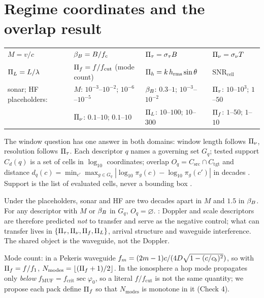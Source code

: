 \documentclass[10pt,a4paper]{article}
\begin{document}
\section{Regime coordinates and the overlap result}
\vspace{-4pt}
\begin{center}\footnotesize\setlength{\tabcolsep}{4pt}
\begin{tabular}{@{}llll@{}}
\toprule
$M=v/c$ & $\beta_{B}=B/f_c$ & $\Pi_{\tau}=\sigma_{\tau} B$ & $\Pi_{\nu}=\sigma_{\nu} T$ \\
$\Pi_{L}=L/\lambda$ & $\Pi_{f}=f/f_{\mathrm{cut}}$ (mode count) & $\Pi_{h}=k\,h_{\mathrm{rms}}\sin\theta$ & $\mathrm{SNR}_{\mathrm{cell}}$ \\
\midrule
sonar; HF placeholders: & $M$: $10^{-3}$--$10^{-2}$; $10^{-6}$--$10^{-5}$ & $\beta_{B}$: $0.3$--$1$; $10^{-3}$--$10^{-2}$ & $\Pi_{\tau}$: $10$--$10^3$; $1$--$50$ \\
& $\Pi_{\nu}$: $0.1$--$10$; $0.1$--$10$ & $\Pi_{L}$: $10$--$100$; $10$--$300$ & $\Pi_{f}$: $1$--$50$; $1$--$10$ \\
\bottomrule
\end{tabular}
\end{center}
The window question has one answer in both domains: window length follows $\Pi_{\nu}$, resolution follows $\Pi_{\tau}$. Each descriptor $q$ names a governing set $G_q$; tested support $C_d(q)$ is a set of cells in $\log_{10}$ coordinates; overlap $O_q=C_{\mathrm{src}}\cap C_{\mathrm{tgt}}$ and distance $d_q(c)=\min_{c'}\max_{g\in G_q}|\log_{10}\pi_g(c)-\log_{10}\pi_g(c')|$ in decades \tagP{}. Support is the list of evaluated cells, never a bounding box \tagG{}.
\begin{proposition}
Under the placeholders, sonar and HF are two decades apart in $M$ and $1.5$ in $\beta_{B}$. For any descriptor with $M$ or $\beta_{B}$ in $G_q$, $O_q=\varnothing$. \tagH{}: Doppler and scale descriptors are therefore predicted \emph{not} to transfer and serve as the negative control; what can transfer lives in $\{\Pi_{\tau},\Pi_{\nu},\Pi_{f},\Pi_{L}\}$, arrival structure and waveguide interference. The shared object is the waveguide, not the Doppler.
\end{proposition}
Mode count: in a Pekeris waveguide $f_m=(2m-1)c/(4D\sqrt{1-(c/c_{b})^2})$, so with $\Pi_{f}=f/f_1$, $N_{\mathrm{modes}}=\lfloor(\Pi_{f}+1)/2\rfloor$. In the ionosphere a hop mode propagates only \emph{below} $f_{\mathrm{MUF}}=f_{\mathrm{crit}}\sec\varphi_0$, so a literal $f/f_{\mathrm{cut}}$ is not the same quantity; we propose each pack define $\Pi_{f}$ so that $N_{\mathrm{modes}}$ is monotone in it (Check 4).
\end{document}
